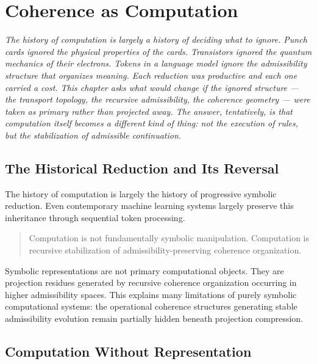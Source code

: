 \documentclass[11pt,openany]{book}
\theoremstyle{definition}
\theoremstyle{plain}
\begin{document}

\chapter{Coherence as Computation}

\noindent\textit{The history of computation is largely a history of deciding what to ignore. Punch cards ignored the physical properties of the cards. Transistors ignored the quantum mechanics of their electrons. Tokens in a language model ignore the admissibility structure that organizes meaning. Each reduction was productive and each one carried a cost. This chapter asks what would change if the ignored structure --- the transport topology, the recursive admissibility, the coherence geometry --- were taken as primary rather than projected away. The answer, tentatively, is that computation itself becomes a different kind of thing: not the execution of rules, but the stabilization of admissible continuation.}

\bigskip

\section{The Historical Reduction and Its Reversal}

The history of computation is largely the history of progressive symbolic reduction. Even contemporary machine learning systems largely preserve this inheritance through sequential token processing.

\begin{quote}
Computation is not fundamentally symbolic manipulation. Computation is recursive stabilization of admissibility-preserving coherence organization.
\end{quote}

Symbolic representations are not primary computational objects. They are projection residues generated by recursive coherence organization occurring in higher admissibility spaces. This explains many limitations of purely symbolic computational systems: the operational coherence structures generating stable admissibility evolution remain partially hidden beneath projection compression.

\section{Computation Without Representation}
\end{document}
